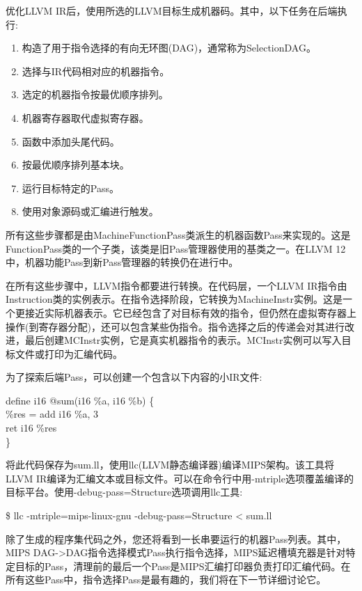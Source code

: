 优化LLVM IR后，使用所选的LLVM目标生成机器码。其中，以下任务在后端执行:\par

\begin{enumerate}
\item 构造了用于指令选择的有向无环图(DAG)，通常称为SelectionDAG。
\item 选择与IR代码相对应的机器指令。
\item 选定的机器指令按最优顺序排列。
\item 机器寄存器取代虚拟寄存器。
\item 函数中添加头尾代码。
\item 按最优顺序排列基本块。
\item 运行目标特定的Pass。
\item 使用对象源码或汇编进行触发。
\end{enumerate}

所有这些步骤都是由MachineFunctionPass类派生的机器函数Pass来实现的。这是FunctionPass类的一个子类，该类是旧Pass管理器使用的基类之一。在LLVM 12中，机器功能Pass到新Pass管理器的转换仍在进行中。\par

在所有这些步骤中，LLVM指令都要进行转换。在代码层，一个LLVM IR指令由Instruction类的实例表示。在指令选择阶段，它转换为MachineInstr实例。这是一个更接近实际机器表示。它已经包含了对目标有效的指令，但仍然在虚拟寄存器上操作(到寄存器分配)，还可以包含某些伪指令。指令选择之后的传递会对其进行改进，最后创建MCInstr实例，它是真实机器指令的表示。MCInstr实例可以写入目标文件或打印为汇编代码。\par

为了探索后端Pass，可以创建一个包含以下内容的小IR文件:\par

\begin{tcolorbox}[colback=white,colframe=black]
define i16 @sum(i16 \%a, i16 \%b) \{ \\
\hspace*{0.5cm}\%res = add i16 \%a, 3 \\
\hspace*{0.5cm}ret i16 \%res \\
\}
\end{tcolorbox}

将此代码保存为sum.ll，使用llc(LLVM静态编译器)编译MIPS架构。该工具将LLVM IR编译为汇编文本或目标文件。可以在命令行中用-mtriple选项覆盖编译的目标平台。使用-debug-pass=\allowbreak Structure选项调用llc工具:\par

\begin{tcolorbox}[colback=white,colframe=black]
\$ llc -mtriple=mips-linux-gnu -debug-pass=Structure < sum.ll
\end{tcolorbox}

除了生成的程序集代码之外，您还将看到一长串要运行的机器Pass列表。其中，MIPS DAG->DAG指令选择模式Pass执行指令选择，MIPS延迟槽填充器是针对特定目标的Pass，清理前的最后一个Pass是MIPS汇编打印器负责打印汇编代码。在所有这些Pass中，指令选择Pass是最有趣的，我们将在下一节详细讨论它。\par












